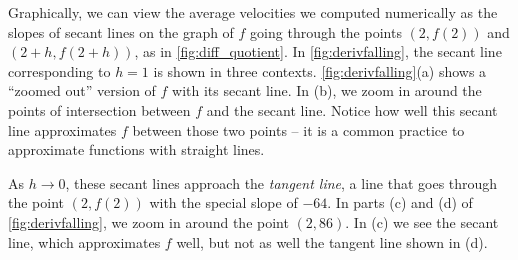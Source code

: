 
Graphically, we can view the average velocities we computed numerically as the slopes of secant lines on the graph of $f$ going through the points $(2,f(2))$ and $(2+h,f(2+h))$, as in \autoref{fig:diff_quotient}. In \autoref{fig:derivfalling}, the secant line corresponding to $h=1$ is shown in three contexts. \autoref{fig:derivfalling}(a) shows a ``zoomed out'' version of $f$ with its secant line. In (b), we zoom in around the points of intersection between $f$ and the secant line. Notice how well this secant line approximates $f$ between those two points -- it is a common practice to approximate functions with straight lines.

As $h\to 0$, these secant lines approach the \textit{tangent line}, a line that goes through the point $(2,f(2))$ with the special slope of $-64$. In parts (c) and (d) of \autoref{fig:derivfalling}, we zoom in around the point $(2,86)$. In (c) we see the secant line, which approximates $f$ well, but not as well the tangent line shown in (d).

